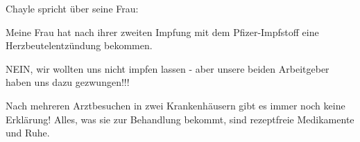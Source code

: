 Chayle spricht über seine Frau:

Meine Frau hat nach ihrer zweiten Impfung mit dem Pfizer-Impfstoff eine
Herzbeutelentzündung bekommen.

NEIN, wir wollten uns nicht impfen lassen - aber unsere beiden Arbeitgeber haben
uns dazu gezwungen!!!

Nach mehreren Arztbesuchen in zwei Krankenhäusern gibt es immer noch keine
Erklärung! Alles, was sie zur Behandlung bekommt, sind rezeptfreie Medikamente
und Ruhe.
